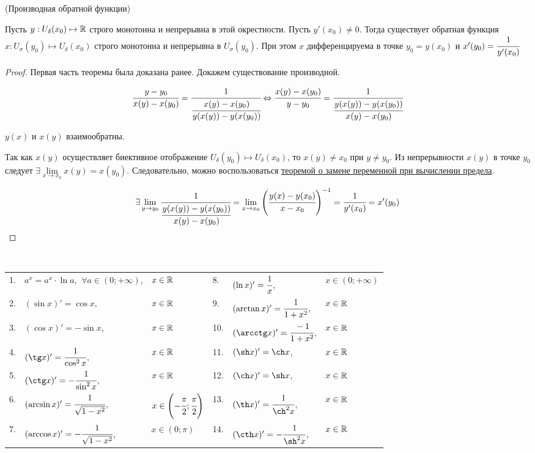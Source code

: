\begin{theorem}
    \hypertarget{5.11}{(Производная обратной функции)} Пусть $y: U_{\delta}(x_{0}) \mapsto \mathbb{R}$ строго монотонна и непрерывна в этой окрестности. Пусть $y'(x_{0}) \neq 0$. Тогда существует обратная функция $x: U_{\sigma}(y_{0}) \mapsto U_{\delta}(x_{0})$ строго монотонна и непрерывна в $U_{\sigma}(y_{0})$. При этом $x$ дифференцируема в точке $y_{0} = y(x_{0})$ и $x'(y_{0}) = \cfrac{1}{y'(x_{0})}$ 
\end{theorem}
\begin{proof}
    Первая часть теоремы была доказана ранее. Докажем существование производной.

    $$\cfrac{y - y_{0}}{x(y) - x(y_{0})} = \cfrac{1}{\cfrac{x(y) - x(y_{0})}{y(x(y)) - y(x(y_{0}))}} \Leftrightarrow \cfrac{x(y) - x(y_{0})}{y - y_{0}} = \cfrac{1}{\cfrac{y(x(y)) - y(x(y_{0}))}{x(y) - x(y_{0})}}$$
    
    $y(x)$ и $x(y)$ взаимообратны.

    Так как $x(y)$ осуществляет биективное отображение $U_{\delta} (y_{0}) \mapsto U_{\delta}(x_{0})$, то $x(y) \neq x_{0} $ при $y \neq y_{0}$. Из непрерывности $x(y)$ в точке $y_{0}$ следует $\exists \lim\limits_{x \to x_{0}} x(y) = x(y_{0}).$
    Следовательно, можно воспользоваться \hyperlink{thrm4.17}{теоремой о замене переменной при вычислении предела}.
    
    $$\exists \lim\limits_{y\to y_{0}} \cfrac{1}{\cfrac{y(x(y)) - y(x(y_{0}))}{x(y) - x(y_{0})}} = \lim\limits_{x \to x_{0}}  \left( \cfrac{y(x) - y(x_{0})}{x - x_{0}}\right)^{-1} = \cfrac{1}{y'(x_{0})} = x'(y_{0})$$    
\end{proof}
\begin{corollary}$\ $

\begin{table}[h]
\begin{tabular}{llllll}
1. & $a^{x} = a^{x} \cdot \ln a$, $\ \forall a \in (0; +\infty)$, & $x\in \mathbb{R}$ & 8. & $(\ln x)' = \cfrac{1}{x}$, & $x \in \left( 0; +\infty\right)$\\
2. & $(\sin x)' = \cos x$, & $x \in \mathbb{R}$ & 9. & $(\arctan x)' = \cfrac{1}{1 + x^{2}}$, & $x \in \mathbb{R}$\\
3. & $(\cos x)' = - \sin x$, & $x \in \mathbb{R}$ & 10. & $(\arcctg x)' = \cfrac{-1}{1 + x^2}$, & $x \in \mathbb{R}$\\
4. & $(\tg x)' = \cfrac{1}{\cos^{2} x}$, & $x \in \mathbb{R}$ & 11. & $(\sh x)' = \ch x$, & $x\in \mathbb{R}$ \\
5. & $(\ctg x)' = -\cfrac{1}{\sin^{2} x}$, & $x \in \mathbb{R}$ & 12. & $(\ch x)' = \sh x$, & $x\in \mathbb{R}$\\
6. & $(\arcsin x)' = \cfrac{1}{\sqrt{1 - x^{2}}}$, & $x \in \left(-\cfrac{\pi}{2}; \cfrac{\pi}{2}\right)$ & 13. & $(\th x)' = \cfrac{1}{\ch^{2} x}$, & $x\in \mathbb{R}$\\
7. & $(\arccos x)' = -\cfrac{1}{\sqrt{1-x^{2}}}$, & $x \in (0; \pi)$ & 14. & $(\cth x)' = -\cfrac{1}{\sh^{2} x}$, & $x\in \mathbb{R}$\\
\end{tabular}
\end{table}
\end{corollary}
